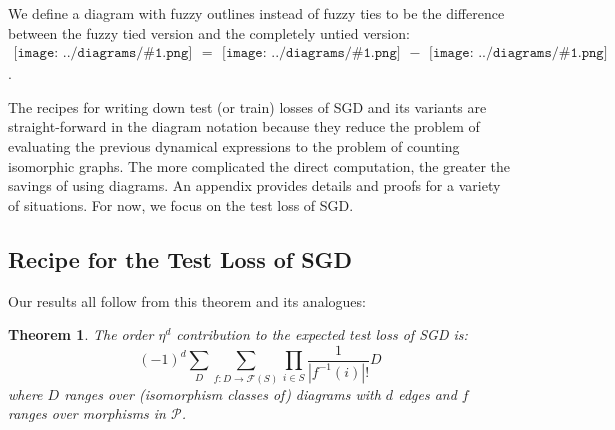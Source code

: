 \documentclass{article}
\newtheorem{thm}{Theorem}
\newcommand{\Free}{\mathcal{F}}
\newcommand{\Pp}{\mathcal{P}}
\newcommand{\sdia}[1]{\begin{gathered}\texttt{[image: ../diagrams/\#1.png]}\end{gathered}}
\begin{document}
    We define a diagram with fuzzy outlines instead of fuzzy ties to be the
    difference between the fuzzy tied version and the completely untied
    version: $\sdia{c(01-2)(01-12)} =
    \sdia{(01-2)(01-12)}-\sdia{(0-1-2)(01-12)}$. 
    
    The recipes for writing down test (or train) losses of SGD and its variants
    are straight-forward in the diagram notation because they reduce the
    problem of evaluating the previous dynamical expressions to the problem of
    counting isomorphic graphs.  The more complicated the direct computation,
    the greater the savings of using diagrams.  An appendix provides details
    and proofs for a variety of situations.  For now, we focus on the test loss
    of SGD.

\subsection{Recipe for the Test Loss of SGD}
    Our results all follow from this theorem and its analogues:
    \begin{thm}
        The order $\eta^d$ contribution to the expected test loss of SGD is:
        \begin{equation}\label{eq:sgdcoef}
            (-1)^d \sum_D \sum_{f: D\to\Free(S)} \prod_{i\in S} \frac{1}{|f^{-1}(i)|!} 
            D
        \end{equation}
        where $D$ ranges over (isomorphism classes of) diagrams with $d$ edges
        and $f$ ranges over morphisms in $\Pp$.
    \end{thm}
\end{document}
